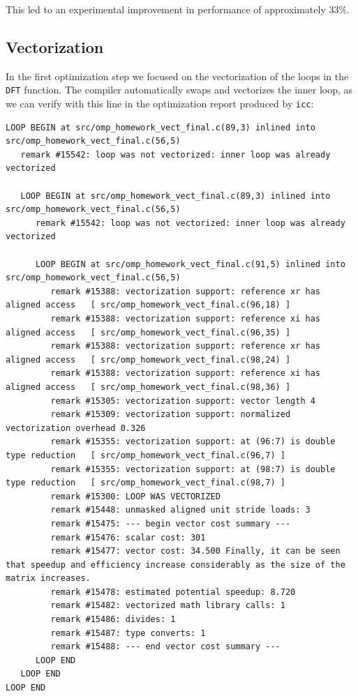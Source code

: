 \documentclass{article}
\begin{document}
This led to an experimental improvement in performance of approximately 33\%.

\subsection{Vectorization}

In the first optimization step we focused on the vectorization of the loops in the \verb|DFT| function. The compiler automatically swaps and vectorizes the inner loop, as we can verify with this line in the optimization report produced by \verb|icc|:
\begin{verbatim}
LOOP BEGIN at src/omp_homework_vect_final.c(89,3) inlined into src/omp_homework_vect_final.c(56,5)
   remark #15542: loop was not vectorized: inner loop was already vectorized

   LOOP BEGIN at src/omp_homework_vect_final.c(89,3) inlined into src/omp_homework_vect_final.c(56,5)
      remark #15542: loop was not vectorized: inner loop was already vectorized

      LOOP BEGIN at src/omp_homework_vect_final.c(91,5) inlined into src/omp_homework_vect_final.c(56,5)
         remark #15388: vectorization support: reference xr has aligned access   [ src/omp_homework_vect_final.c(96,18) ]
         remark #15388: vectorization support: reference xi has aligned access   [ src/omp_homework_vect_final.c(96,35) ]
         remark #15388: vectorization support: reference xr has aligned access   [ src/omp_homework_vect_final.c(98,24) ]
         remark #15388: vectorization support: reference xi has aligned access   [ src/omp_homework_vect_final.c(98,36) ]
         remark #15305: vectorization support: vector length 4
         remark #15309: vectorization support: normalized vectorization overhead 0.326
         remark #15355: vectorization support: at (96:7) is double type reduction   [ src/omp_homework_vect_final.c(96,7) ]
         remark #15355: vectorization support: at (98:7) is double type reduction   [ src/omp_homework_vect_final.c(98,7) ]
         remark #15300: LOOP WAS VECTORIZED
         remark #15448: unmasked aligned unit stride loads: 3 
         remark #15475: --- begin vector cost summary ---
         remark #15476: scalar cost: 301 
         remark #15477: vector cost: 34.500 Finally, it can be seen that speedup and efficiency increase considerably as the size of the matrix increases.
         remark #15478: estimated potential speedup: 8.720 
         remark #15482: vectorized math library calls: 1 
         remark #15486: divides: 1 
         remark #15487: type converts: 1 
         remark #15488: --- end vector cost summary ---
      LOOP END
   LOOP END
LOOP END
\end{verbatim}
\end{document}

